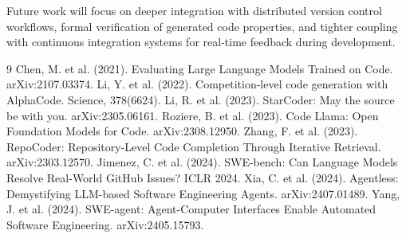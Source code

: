 \documentclass[11pt,a4paper]{article}
\begin{document}
Future work will focus on deeper integration with distributed version control workflows, formal verification of generated code properties, and tighter coupling with continuous integration systems for real-time feedback during development.

\begin{thebibliography}{9}
 Chen, M. et al. (2021). Evaluating Large Language Models Trained on Code. arXiv:2107.03374.
 Li, Y. et al. (2022). Competition-level code generation with AlphaCode. Science, 378(6624).
 Li, R. et al. (2023). StarCoder: May the source be with you. arXiv:2305.06161.
 Roziere, B. et al. (2023). Code Llama: Open Foundation Models for Code. arXiv:2308.12950.
 Zhang, F. et al. (2023). RepoCoder: Repository-Level Code Completion Through Iterative Retrieval. arXiv:2303.12570.
 Jimenez, C. et al. (2024). SWE-bench: Can Language Models Resolve Real-World GitHub Issues? ICLR 2024.
 Xia, C. et al. (2024). Agentless: Demystifying LLM-based Software Engineering Agents. arXiv:2407.01489.
 Yang, J. et al. (2024). SWE-agent: Agent-Computer Interfaces Enable Automated Software Engineering. arXiv:2405.15793.
\end{thebibliography}
\end{document}
